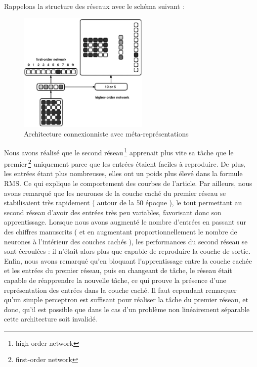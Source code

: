 \documentclass[a4paper,12pt]{article}
\begin{document}
Rappelons la structure des réseaux avec le schéma suivant :
\begin{figure}[h]
\begin{center}
 \includegraphics[width=240px]{../cleeremans_2007/digit_reco/digit_reco.png}
\end{center}
\caption{ \protect \footnotemark Architecture connexionniste avec méta-représentations  }
\end{figure}

Nous avons réalisé que le second réseau\,\footnote{high-order network} apprenait 
plus vite sa tâche que le premier\,\footnote{first-order network}
uniquement parce que les entrées étaient faciles à reproduire. De plus, les entrées
étant plus nombreuses, elles ont un poids plus élevé dans la formule RMS. Ce qui 
explique le comportement des courbes de l'article.
\newline
Par ailleurs, nous avons remarqué que les neurones de la couche caché du premier
réseau se stabilisaient très rapidement ( autour de la 50 époque ), le tout
permettant au second réseau d'avoir des entrées très peu variables, favorisant donc son
apprentissage.
\newline
Lorsque nous avons 
augmenté le nombre d'entrées en passant sur des chiffres manuscrits ( et en 
augmentant proportionnellement le nombre de neurones à l'intérieur des couches
cachés ), les performances du second réseau se sont écroulées : il n'était alors
plus que capable de reproduire la couche de sortie.
\newline
Enfin, nous avons remarqué qu'en bloquant l'apprentissage entre la couche cachée et les 
entrées du premier réseau, puis en changeant de tâche, le réseau était capable de réapprendre
la nouvelle tâche, ce qui prouve la présence d'une représentation des entrées dans la couche 
caché.
\newline
\newline
Il faut cependant remarquer qu'un simple perceptron est suffisant pour réaliser la tâche
du premier réseau, et donc, qu'il est possible que dans le cas d'un problème non linéairement
séparable cette architecture soit invalidé.
\end{document}
